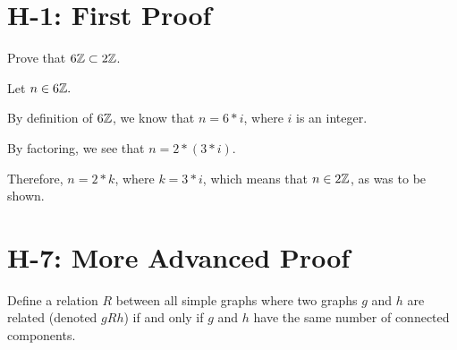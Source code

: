 \documentclass{article}
\begin{document}
\section{H-1: First Proof}
\label{appendix:h1}
Prove that $6{\mathbb Z} \subset 2{\mathbb Z}$.

Let $n \in 6{\mathbb Z}.$ 

By definition of $6{\mathbb Z}$, we know that $n= 6*i$, where $i$ is an integer.

By factoring, we see that $n=2 * (3 * i)$.

Therefore, $n=2*k$, where $k=3*i$, which means that $n \in 2{\mathbb Z}$, as was to be shown.

\section{H-7: More Advanced Proof}
\label{appendix:h7-1}
Define a relation $R$ between all simple graphs where two graphs $g$ and $h$ are
related (denoted $gRh$) if and only if $g$ and $h$ have the same number of
connected components.
\end{document}
